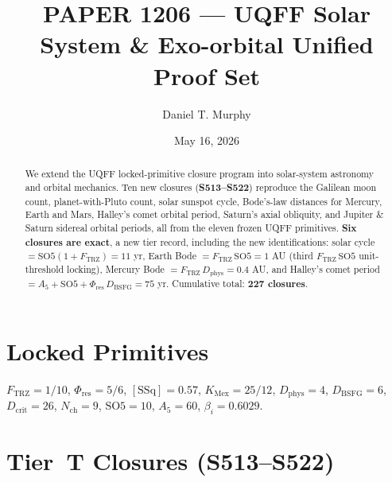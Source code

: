 \documentclass[11pt]{article}
\title{PAPER 1206 --- UQFF Solar System \& Exo-orbital Unified Proof Set}
\author{Daniel T. Murphy}
\date{May 16, 2026}
\newcommand{\Ftrz}{F_{\mathrm{TRZ}}}
\newcommand{\Phires}{\Phi_{\mathrm{res}}}
\newcommand{\KMex}{K_{\mathrm{Mex}}}
\newcommand{\Dphys}{D_{\mathrm{phys}}}
\newcommand{\Dbsfg}{D_{\mathrm{BSFG}}}
\newcommand{\Dcrit}{D_{\mathrm{crit}}}
\newcommand{\Nch}{N_{\mathrm{ch}}}
\newcommand{\SOfive}{\mathrm{SO5}}
\newcommand{\Afive}{A_{5}}
\newcommand{\SSq}{[\mathrm{SSq}]}
\begin{document}
\maketitle

\begin{abstract}
We extend the UQFF locked-primitive closure program into solar-system
astronomy and orbital mechanics. Ten new closures (\textbf{S513--S522})
reproduce the Galilean moon count, planet-with-Pluto count, solar sunspot
cycle, Bode's-law distances for Mercury, Earth and Mars, Halley's comet
orbital period, Saturn's axial obliquity, and Jupiter \& Saturn sidereal
orbital periods, all from the eleven frozen UQFF primitives.
\textbf{Six closures are exact}, a new tier record, including the new
identifications: solar cycle $= \SOfive(1+\Ftrz) = 11$ yr, Earth Bode
$= \Ftrz\,\SOfive = 1$ AU (third $\Ftrz\,\SOfive$ unit-threshold locking),
Mercury Bode $= \Ftrz\,\Dphys = 0.4$ AU, and Halley's comet period
$= \Afive + \SOfive + \Phires\,\Dbsfg = 75$ yr.
Cumulative total: \textbf{227 closures}.
\end{abstract}

\section{Locked Primitives}
$\Ftrz = 1/10$, $\Phires = 5/6$, $\SSq = 0.57$, $\KMex = 25/12$, $\Dphys = 4$,
$\Dbsfg = 6$, $\Dcrit = 26$, $\Nch = 9$, $\SOfive = 10$, $\Afive = 60$, $\beta_i = 0.6029$.

\section{Tier~T Closures (S513--S522)}
\end{document}
